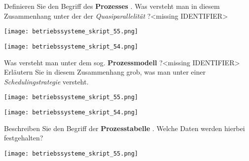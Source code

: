 \documentclass{article}
\begin{document}
\begin{tcolorbox}[colback=white!10!white,colframe=lightgray!75!black,
  savelowerto=\jobname_ex.tex,breakable,enhanced,lines before break=40]

\begin{center}
Definieren Sie den Begriff des 
\textbf{Prozesses
}. 
Was versteht man in diesem Zusammenhang unter der der 
\textit{Quasiparallelität
}?<missing IDENTIFIER>

\end{center}

\tcblower

\justifying
\begin{center}
\texttt{[image: betriebssysteme\_skript\_55.png]}
\end{center}
\begin{center}
\texttt{[image: betriebssysteme\_skript\_54.png]}
\end{center}

\end{tcolorbox}
\begin{tcolorbox}[colback=white!10!white,colframe=lightgray!75!black,
  savelowerto=\jobname_ex.tex,breakable,enhanced,lines before break=40]

\begin{center}
Was versteht man unter dem sog. 
\textbf{Prozessmodell
}?<missing IDENTIFIER>
Erläutern Sie in diesem Zusammenhang grob, was man unter einer 
\textit{Schedulingstrategie
} versteht.

\end{center}

\tcblower

\justifying
\begin{center}
\texttt{[image: betriebssysteme\_skript\_55.png]}
\end{center}
\begin{center}
\texttt{[image: betriebssysteme\_skript\_54.png]}
\end{center}

\end{tcolorbox}
\begin{tcolorbox}[colback=white!10!white,colframe=lightgray!75!black,
  savelowerto=\jobname_ex.tex,breakable,enhanced,lines before break=40]

\begin{center}
Beschreiben Sie den Begriff der 
\textbf{Prozesstabelle
}.
Welche Daten werden hierbei festgehalten?

\end{center}

\tcblower

\justifying
\begin{center}
\texttt{[image: betriebssysteme\_skript\_55.png]}
\end{center}

\end{tcolorbox}
\end{document}
